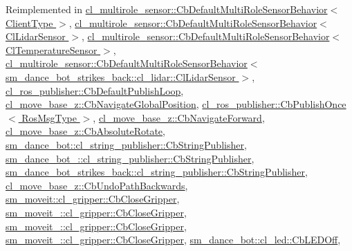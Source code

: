 Reimplemented in \hyperlink{classcl__multirole__sensor_1_1CbDefaultMultiRoleSensorBehavior_a0f400c7e29d0cb1dda11242a5a922f4c}{cl\+\_\+multirole\+\_\+sensor\+::\+Cb\+Default\+Multi\+Role\+Sensor\+Behavior$<$ Client\+Type $>$}, \hyperlink{classcl__multirole__sensor_1_1CbDefaultMultiRoleSensorBehavior_a0f400c7e29d0cb1dda11242a5a922f4c}{cl\+\_\+multirole\+\_\+sensor\+::\+Cb\+Default\+Multi\+Role\+Sensor\+Behavior$<$ Cl\+Lidar\+Sensor $>$}, \hyperlink{classcl__multirole__sensor_1_1CbDefaultMultiRoleSensorBehavior_a0f400c7e29d0cb1dda11242a5a922f4c}{cl\+\_\+multirole\+\_\+sensor\+::\+Cb\+Default\+Multi\+Role\+Sensor\+Behavior$<$ Cl\+Temperature\+Sensor $>$}, \hyperlink{classcl__multirole__sensor_1_1CbDefaultMultiRoleSensorBehavior_a0f400c7e29d0cb1dda11242a5a922f4c}{cl\+\_\+multirole\+\_\+sensor\+::\+Cb\+Default\+Multi\+Role\+Sensor\+Behavior$<$ sm\+\_\+dance\+\_\+bot\+\_\+strikes\+\_\+back\+::cl\+\_\+lidar\+::\+Cl\+Lidar\+Sensor $>$}, \hyperlink{classcl__ros__publisher_1_1CbDefaultPublishLoop_a206c6bc09e7c6414304b679ec415c19f}{cl\+\_\+ros\+\_\+publisher\+::\+Cb\+Default\+Publish\+Loop}, \hyperlink{classcl__move__base__z_1_1CbNavigateGlobalPosition_a5c18268af1e7fc236aa155a58345d5d7}{cl\+\_\+move\+\_\+base\+\_\+z\+::\+Cb\+Navigate\+Global\+Position}, \hyperlink{classcl__ros__publisher_1_1CbPublishOnce_ad82cb7d6ac69fe9b91bc955550ab92cb}{cl\+\_\+ros\+\_\+publisher\+::\+Cb\+Publish\+Once$<$ Ros\+Msg\+Type $>$}, \hyperlink{classcl__move__base__z_1_1CbNavigateForward_a2160484562ef5fb1c655fab7f990241e}{cl\+\_\+move\+\_\+base\+\_\+z\+::\+Cb\+Navigate\+Forward}, \hyperlink{classcl__move__base__z_1_1CbAbsoluteRotate_a0e362b8e9f0d7de5aeee183ba4031437}{cl\+\_\+move\+\_\+base\+\_\+z\+::\+Cb\+Absolute\+Rotate}, \hyperlink{classsm__dance__bot_1_1cl__string__publisher_1_1CbStringPublisher_ac93cc1eb150140331cb3e560ec8249e2}{sm\+\_\+dance\+\_\+bot\+::cl\+\_\+string\+\_\+publisher\+::\+Cb\+String\+Publisher}, \hyperlink{classsm__dance__bot__2_1_1cl__string__publisher_1_1CbStringPublisher_aee990acdb5ec33f1d22efafbe32216f2}{sm\+\_\+dance\+\_\+bot\+\_\+::cl\+\_\+string\+\_\+publisher\+::\+Cb\+String\+Publisher}, \hyperlink{classsm__dance__bot__strikes__back_1_1cl__string__publisher_1_1CbStringPublisher_ae4aa02553119822c583bb2abb44c810c}{sm\+\_\+dance\+\_\+bot\+\_\+strikes\+\_\+back\+::cl\+\_\+string\+\_\+publisher\+::\+Cb\+String\+Publisher}, \hyperlink{classcl__move__base__z_1_1CbUndoPathBackwards_a20cee921ad92db16f8d17c3c3b9c2daf}{cl\+\_\+move\+\_\+base\+\_\+z\+::\+Cb\+Undo\+Path\+Backwards}, \hyperlink{classsm__moveit_1_1cl__gripper_1_1CbCloseGripper_a643cca41b7a62a3c2b26e07ab7edb05a}{sm\+\_\+moveit\+::cl\+\_\+gripper\+::\+Cb\+Close\+Gripper}, \hyperlink{classsm__moveit__2_1_1cl__gripper_1_1CbCloseGripper_a6dfd0cf0abefda948c23767508cd8d86}{sm\+\_\+moveit\+\_\+::cl\+\_\+gripper\+::\+Cb\+Close\+Gripper}, \hyperlink{classsm__moveit__3_1_1cl__gripper_1_1CbCloseGripper_ad78af2da289e83bd9a7087bc31b14ecb}{sm\+\_\+moveit\+\_\+::cl\+\_\+gripper\+::\+Cb\+Close\+Gripper}, \hyperlink{classsm__moveit__4_1_1cl__gripper_1_1CbCloseGripper_a9c907d899c60fff004eb9f2d5e29913b}{sm\+\_\+moveit\+\_\+::cl\+\_\+gripper\+::\+Cb\+Close\+Gripper}, \hyperlink{classsm__dance__bot_1_1cl__led_1_1CbLEDOff_ad0db28985308dd486943d1f511c655ad}{sm\+\_\+dance\+\_\+bot\+::cl\+\_\+led\+::\+Cb\+L\+E\+D\+Off}, 